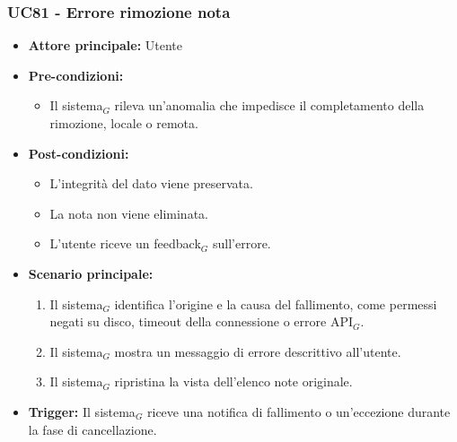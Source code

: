 \documentclass[a4paper, 10pt]{article}
\begin{document}
\subsubsection{UC81 - Errore rimozione nota}
\hypertarget{uc:81}{}
\begin{itemize}
    \item \textbf{Attore principale:} Utente
    \item \textbf{Pre-condizioni:} 
        \begin{itemize}
            \item Il sistema$_G$ rileva un'anomalia che impedisce il completamento della rimozione, locale o remota.
        \end{itemize}
    \item \textbf{Post-condizioni:} 
        \begin{itemize}
            \item L'integrità del dato viene preservata.
            \item La nota non viene eliminata.
            \item L'utente riceve un feedback$_G$ sull'errore.
        \end{itemize}
    \item \textbf{Scenario principale:}
        \begin{enumerate}
            \item Il sistema$_G$ identifica l'origine e la causa del fallimento, come permessi negati su disco, timeout della connessione o errore API$_G$.
            \item Il sistema$_G$ mostra un messaggio di errore descrittivo all'utente.
            \item Il sistema$_G$ ripristina la vista dell'elenco note originale.
        \end{enumerate}
    \item \textbf{Trigger:} Il sistema$_G$ riceve una notifica di fallimento o un'eccezione durante la fase di cancellazione.
\end{itemize}
\end{document}
